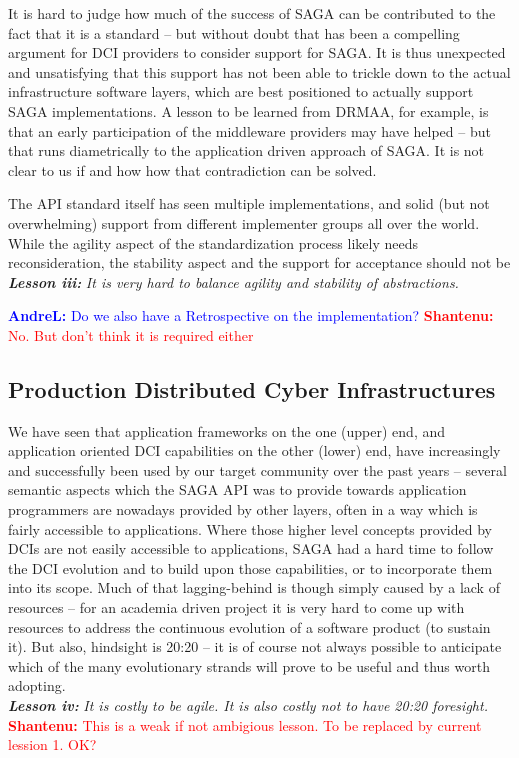 \documentclass[]{article}
\newcommand{\I}[1]{\textit{#1}}
\newcommand{\B}[1]{\textbf{#1}}
\newcommand{\BI}[1]{\textbf{\textit{#1}}}
\newcommand{\jhanote}[1]{{\textcolor{red}{     \B{Shantenu:} #1 }}}
\newcommand{\alnote}[1]{{\textcolor{blue}{    \B{AndreL:  } #1 }}}
\newcommand{\jhanote}[1]{}
\newcommand{\alnote}[1]{}
\begin{document}
  It is hard to judge how much of the success of SAGA can be
  contributed to the fact that it is a standard -- but without doubt
  that has been a compelling argument for DCI providers to consider
  support for SAGA.  It is thus unexpected and unsatisfying that this
  support has not been able to trickle down to the actual
  infrastructure software layers, which are best positioned to
  actually support SAGA implementations.  A lesson to be learned from
  DRMAA, for example, is that an early participation of the middleware
  providers may have helped -- but that runs diametrically to the
  application driven approach of SAGA.  It is not clear to us if and
  how how that contradiction can be solved.

  The API standard itself has seen multiple implementations, and solid
  (but not overwhelming) support from different implementer groups all
  over the world.  While the agility aspect of the standardization
  process likely needs reconsideration, the stability aspect and the
  support for acceptance should not be\\
  \BI{Lesson iii:} \I{It is very hard to balance agility and stability
  of abstractions.}

\alnote{Do we also have a Retrospective on the
  implementation?}\jhanote{No. But don't think it is required either}

\subsection{Production Distributed Cyber Infrastructures}

We have seen that application frameworks on the one (upper) end, and
application oriented DCI capabilities on the other (lower) end, have
increasingly and successfully been used by our target community over
the past years -- several semantic aspects which the SAGA API was to
provide towards application programmers are nowadays provided by other
layers, often in a way which is fairly accessible to applications.
Where those higher level concepts provided by DCIs are not easily
accessible to applications, SAGA had a hard time to follow the DCI
evolution and to build upon those capabilities, or to incorporate them
into its scope.  Much of that lagging-behind is though simply caused
by a lack of resources -- for an academia driven project it is very
hard to come up with resources to address the continuous evolution of
a software product (to sustain it).  But also, hindsight is 20:20 --
it is of course not always possible to anticipate which of the many
evolutionary strands will prove to be
useful and thus worth adopting.\\
\BI{Lesson iv:} \I{It is costly to be agile. It is also costly not to
  have 20:20 foresight.} \jhanote{This is a weak if not ambigious
  lesson. To be replaced by current lession 1. OK?}
\end{document}
